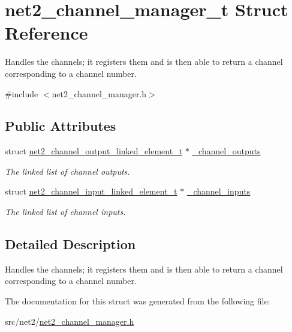 \hypertarget{structnet2__channel__manager__t}{}\section{net2\+\_\+channel\+\_\+manager\+\_\+t Struct Reference}
\label{structnet2__channel__manager__t}


Handles the channels; it registers them and is then able to return a channel corresponding to a channel number.  




{\ttfamily \#include $<$net2\+\_\+channel\+\_\+manager.\+h$>$}

\subsection*{Public Attributes}
\begin{DoxyCompactItemize}
\item 
\hypertarget{structnet2__channel__manager__t_a994bf9242cb70c45711e2a670123a18e}{}struct \hyperlink{structnet2__channel__output__linked__element__t}{net2\+\_\+channel\+\_\+output\+\_\+linked\+\_\+element\+\_\+t} $\ast$ \hyperlink{structnet2__channel__manager__t_a994bf9242cb70c45711e2a670123a18e}{\+\_\+channel\+\_\+outputs}\label{structnet2__channel__manager__t_a994bf9242cb70c45711e2a670123a18e}

\begin{DoxyCompactList}\small\item\em The linked list of channel outputs. \end{DoxyCompactList}\item 
\hypertarget{structnet2__channel__manager__t_a3e16fdcf5489413c2fabc6c009545ae1}{}struct \hyperlink{structnet2__channel__input__linked__element__t}{net2\+\_\+channel\+\_\+input\+\_\+linked\+\_\+element\+\_\+t} $\ast$ \hyperlink{structnet2__channel__manager__t_a3e16fdcf5489413c2fabc6c009545ae1}{\+\_\+channel\+\_\+inputs}\label{structnet2__channel__manager__t_a3e16fdcf5489413c2fabc6c009545ae1}

\begin{DoxyCompactList}\small\item\em The linked list of channel inputs. \end{DoxyCompactList}\end{DoxyCompactItemize}


\subsection{Detailed Description}
Handles the channels; it registers them and is then able to return a channel corresponding to a channel number. 

The documentation for this struct was generated from the following file\+:\begin{DoxyCompactItemize}
\item 
src/net2/\hyperlink{net2__channel__manager_8h}{net2\+\_\+channel\+\_\+manager.\+h}\end{DoxyCompactItemize}

